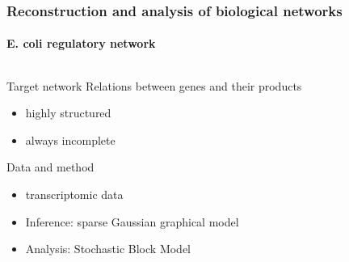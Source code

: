 \begin{frame}
  \frametitle{Reconstruction and analysis of biological networks} 
  \framesubtitle{E. coli regulatory network}  

  \begin{columns}
    \begin{column}{.4\textwidth}
      \begin{small}
        \begin{block}{Target network}
          Relations between genes and their products
          \begin{itemize}
          \item highly structured
          \item always incomplete
          \end{itemize}
        \end{block}
      \end{small}
      \begin{small}
        \begin{block}{Data and method}
          \begin{itemize}
          \item transcriptomic data
          \item \alert{Inference}: sparse Gaussian graphical model
          \item \alert{Analysis}: Stochastic Block Model
          \end{itemize}
        \end{block}
      \end{small}
    \end{column}
    \begin{column}{.55\textwidth}

\end{column}
\end{columns}
\end{frame}
